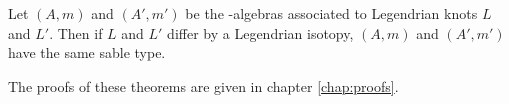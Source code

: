\begin{them}
\label{prop:stable_tame_inv}
Let $(A,m)$ and $(A', m')$ be the \Ainf-algebras associated to Legendrian knots $L$ and $L'$. Then if $L$ and $L'$ differ by a Legendrian isotopy, $(A,m)$ and $(A',m')$ have the same sable type.
\end{them}

The proofs of these theorems are given in chapter \ref{chap:proofs}.

